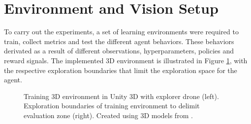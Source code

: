 \section{Environment and Vision Setup}\label{chap:4:setup}



To carry out the experiments, a set of learning environments were required to train, collect metrics and test the different agent behaviors. These behaviors derivated as a result of different observations, hyperparameters, policies and reward signals. The implemented 3D environment is illustrated in Figure \ref{fig:unity-island}, with the respective exploration boundaries that limit the exploration space for the agent.

\begin{figure}[!ht]
    \centering
    \caption{Training 3D environment in Unity 3D with explorer drone (left). Exploration boundaries of training environment to delimit evaluation zone (right). Created using 3D models from \cite{unity-asset-store}.}
    \label{fig:unity-island}
\end{figure}

% 

